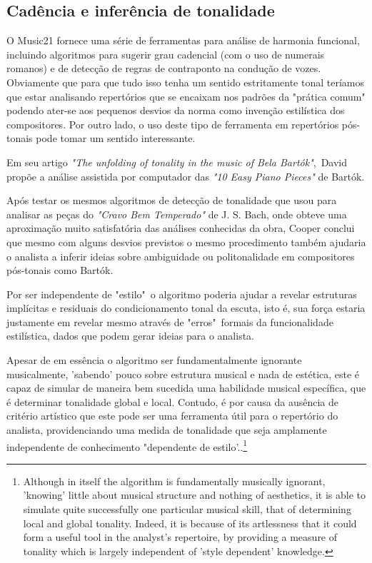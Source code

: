 \documentclass[
	12pt,				%
	openright,			%
	twoside,			%
	a4paper,			%
	english,			%
	french,				%
	spanish,			%
	brazil				%
	]{abntex2}
\begin{document}
\subsection{Cadência e inferência de tonalidade}


O Music21 fornece uma série de ferramentas para análise de harmonia funcional, incluindo algoritmos para sugerir grau cadencial (com o uso de numerais romanos) e de detecção de regras de contraponto na condução de vozes. Obviamente que para que tudo isso tenha um sentido estritamente tonal teríamos que estar analisando repertórios que se encaixam nos padrões da "prática comum"\cite[ p.354]{temperley2001cognition} podendo ater-se aos pequenos desvios da norma como invenção estilística dos compositores. Por outro lado, o uso deste tipo de ferramenta em repertórios pós-tonais pode tomar um sentido interessante. 

Em seu artigo \textit{"The unfolding of tonality in the music of Bela Bartók"},\ David  propõe a análise assistida por computador das \textit{"10 Easy Piano Pieces"} de Bartók. 

Após testar os mesmos algoritmos de detecção de tonalidade que usou para analisar as peças do \textit{"Cravo Bem Temperado"} de J. S. Bach, onde obteve uma aproximação muito satisfatória das análises conhecidas da obra, Cooper conclui que mesmo com alguns desvios previstos o mesmo procedimento também ajudaria o analista a inferir ideias sobre ambiguidade ou politonalidade em compositores pós-tonais como Bartók.

Por ser independente de "estilo"\ o algoritmo poderia ajudar a revelar estruturas implícitas e residuais do condicionamento tonal da escuta, isto é, sua força estaria justamente em revelar mesmo através de "erros"\ formais da funcionalidade estilística, dados que podem gerar ideias para o analista.

\begin{citacao}
Apesar de em essência o algoritmo ser fundamentalmente ignorante musicalmente, 'sabendo' pouco sobre estrutura musical e nada de estética, este é capaz de simular de maneira bem sucedida uma habilidade musical específica, que é determinar tonalidade global e local. Contudo, é por causa da ausência de critério artístico que este pode ser uma ferramenta útil para o repertório do analista, providenciando uma medida de tonalidade que seja amplamente independente de conhecimento "dependente de estilo'.\cite[ p.34-35]{cooper1998unfolding}.\footnote{Although in itself the algorithm is fundamentally musically ignorant, 'knowing' little about musical structure and nothing of aesthetics, it is able to simulate quite successfully one particular musical skill, that of determining local and global tonality. Indeed, it is because of its artlessness that it could form a useful tool in the analyst's repertoire, by providing a measure of tonality which is largely independent of 'style dependent' knowledge.\cite[ p.34-35]{cooper1998unfolding}}
\end{citacao}
\end{document}
